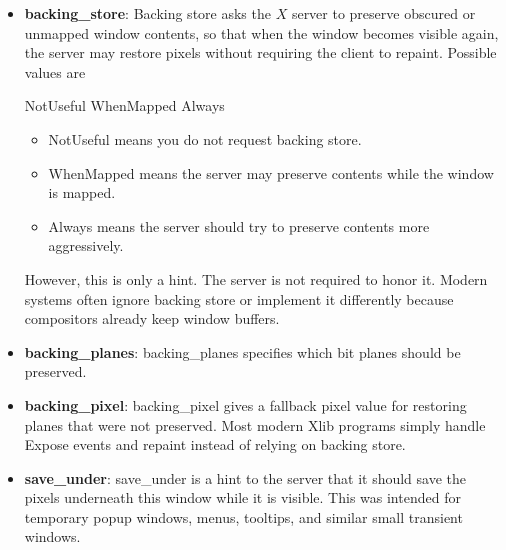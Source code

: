 \documentclass{report}
\begin{document}
\begin{itemize}
\begin{itemize}
                    \bigbreak \noindent 
                    A win-gravity of \textbf{UnmapGravity} is like \textbf{NorthWestGravity} (the window is not moved), except the child is also unmapped when the parent is resized, and an \textbf{UnmapNotify} event is generated.
                \item \textbf{backing\_store}:  Backing store asks the $X$ server to preserve obscured or unmapped window contents, so that when the window becomes visible again, the server may restore pixels without requiring the client to repaint.
                    \bigbreak \noindent 
                    Possible values are
                    \bigbreak \noindent 
                    \begin{cppcode}
                        NotUseful
                        WhenMapped
                        Always
                    \end{cppcode}
                    \bigbreak \noindent 
                    \begin{itemize}
                        \item NotUseful means you do not request backing store.
                        \item WhenMapped means the server may preserve contents while the window is mapped.
                        \item Always means the server should try to preserve contents more aggressively.
                    \end{itemize}
                    However, this is only a hint. The server is not required to honor it. Modern systems often ignore backing store or implement it differently because compositors already keep window buffers.
                \item \textbf{backing\_planes}: backing\_planes specifies which bit planes should be preserved.
                \item \textbf{backing\_pixel}: backing\_pixel gives a fallback pixel value for restoring planes that were not preserved.
                    \bigbreak \noindent 
                    Most modern Xlib programs simply handle Expose events and repaint instead of relying on backing store.
                \item \textbf{save\_under}: save\_under is a hint to the server that it should save the pixels underneath this window while it is visible.
                    \bigbreak \noindent 
                    This was intended for temporary popup windows, menus, tooltips, and similar small transient windows.
                    \bigbreak \noindent 

\end{itemize}
\end{itemize}
\end{document}
